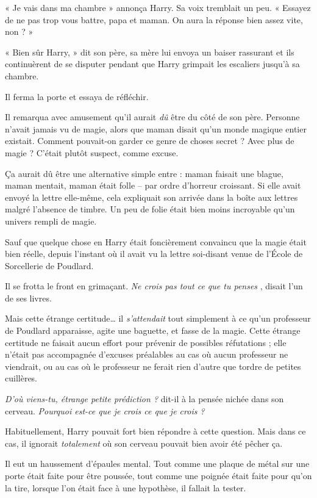 « Je vais dans ma chambre » annonça Harry. Sa voix tremblait un peu. « Essayez de ne pas trop vous battre, papa et maman. On aura la réponse bien assez vite, non ? »

« Bien sûr Harry, » dit son père, sa mère lui envoya un baiser rassurant et ils continuèrent de se disputer pendant que Harry grimpait les escaliers jusqu'à sa chambre.

Il ferma la porte et essaya de réfléchir.

Il remarqua avec amusement qu'il aurait \emph{dû}  être du côté de son père. Personne n'avait jamais vu de magie, alors que maman disait qu'un monde magique entier existait. Comment pouvait-on garder ce genre de choses secret ? Avec plus de magie ? C'était plutôt suspect, comme excuse.

Ça aurait dû être une alternative simple entre : maman faisait une blague, maman mentait, maman était folle – par ordre d'horreur croissant. Si elle avait envoyé la lettre elle-même, cela expliquait son arrivée dans la boîte aux lettres malgré l'absence de timbre. Un peu de folie était bien moins incroyable qu'un univers rempli de magie.

Sauf que quelque chose en Harry était foncièrement convaincu que la magie était bien réelle, depuis l'instant où il avait vu la lettre soi-disant venue de l'École de Sorcellerie de Poudlard.

Il se frotta le front en grimaçant. \emph{Ne crois pas tout ce que tu penses} , disait l'un de ses livres.

Mais cette étrange certitude… il \emph{s'attendait}  tout simplement à ce qu'un professeur de Poudlard apparaisse, agite une baguette, et fasse de la magie. Cette étrange certitude ne faisait aucun effort pour prévenir de possibles réfutations ; elle n'était pas accompagnée d'excuses préalables au cas où aucun professeur ne viendrait, ou au cas où le professeur ne ferait rien d'autre que tordre de petites cuillères.

\emph{D'où viens-tu, étrange petite prédiction ?}  dit-il à la pensée nichée dans son cerveau. \emph{Pourquoi est-ce que je crois ce que je crois ?} 

Habituellement, Harry pouvait fort bien répondre à cette question. Mais dans ce cas, il ignorait \emph{totalement}  où son cerveau pouvait bien avoir été pêcher ça.

Il eut un haussement d'épaules mental. Tout comme une plaque de métal sur une porte était faite pour être poussée, tout comme une poignée était faite pour qu'on la tire, lorsque l'on était face à une hypothèse, il fallait la tester.

